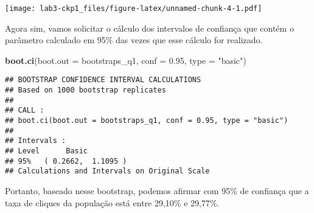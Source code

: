 \documentclass[]{article}
\newenvironment{Shaded}{\begin{snugshade}}{\end{snugshade}}
\newcommand{\KeywordTok}[1]{\textcolor[rgb]{0.13,0.29,0.53}{\textbf{#1}}}
\newcommand{\DataTypeTok}[1]{\textcolor[rgb]{0.13,0.29,0.53}{#1}}
\newcommand{\DecValTok}[1]{\textcolor[rgb]{0.00,0.00,0.81}{#1}}
\newcommand{\FloatTok}[1]{\textcolor[rgb]{0.00,0.00,0.81}{#1}}
\newcommand{\StringTok}[1]{\textcolor[rgb]{0.31,0.60,0.02}{#1}}
\newcommand{\OperatorTok}[1]{\textcolor[rgb]{0.81,0.36,0.00}{\textbf{#1}}}
\newcommand{\NormalTok}[1]{#1}
\begin{document}
\begin{Shaded}
\end{Shaded}

\texttt{[image: lab3-ckp1\_files/figure-latex/unnamed-chunk-4-1.pdf]}

Agora sim, vamos solicitar o cálculo dos intervalos de confiança que
contém o parâmetro calculado em 95\% das vezes que esse cálculo for
realizado.

\begin{Shaded}
\begin{Highlighting}[]
\KeywordTok{boot.ci}\NormalTok{(}\DataTypeTok{boot.out =}\NormalTok{ bootstraps_q1, }\DataTypeTok{conf =} \FloatTok{0.95}\NormalTok{, }\DataTypeTok{type =} \StringTok{"basic"}\NormalTok{)}
\end{Highlighting}
\end{Shaded}

\begin{verbatim}
## BOOTSTRAP CONFIDENCE INTERVAL CALCULATIONS
## Based on 1000 bootstrap replicates
## 
## CALL : 
## boot.ci(boot.out = bootstraps_q1, conf = 0.95, type = "basic")
## 
## Intervals : 
## Level      Basic         
## 95%   ( 0.2662,  1.1095 )  
## Calculations and Intervals on Original Scale
\end{verbatim}

Portanto, baseado nesse bootstrap, podemos afirmar com 95\% de confiança
que a taxa de cliques da população está entre 29,10\% e 29,77\%.
\end{document}
